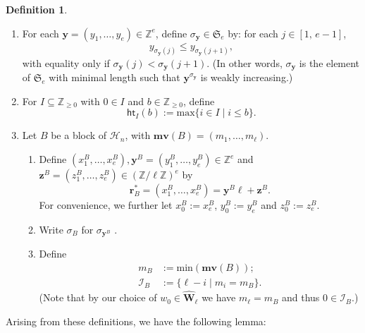 \documentclass[11pt,a4paper,reqno]{amsart}
\numberwithin{equation}{section}
\theoremstyle{plain}
\theoremstyle{definition}
\newtheorem{Def}[thm]{Definition}
\theoremstyle{remark}
\numberwithin{equation}{section}
\newcommand{\br}{\mathbf{r}}
\newcommand{\by}{\mathbf{y}}
\newcommand{\bz}{\mathbf{z}}
\newcommand{\mv}{\mathbf{mv}}
\renewcommand{\min}{\mathrm{min}}
\renewcommand{\max}{\mathrm{max}}
\newcommand{\ZZ}{\mathbb{Z}}
\newcommand{\HH}{\mathcal{H}}
\newcommand{\EW}{\widehat{\mathbf{W}}}
\newcommand{\sym}[1]{\mathfrak{S}_{#1}}
\newcommand{\Ht}{\mathsf{ht}}
\newcommand{\II}{\mathcal{I}}
\begin{document}
\begin{Def} \label{D:}  \hfill
\begin{enumerate}
\item For each $\by = (y_1,\dotsc, y_e) \in \ZZ^e$, define $\sigma_{\by} \in \sym{e}$ by: for each $j \in [1,\,e-1]$,
$$ y_{\sigma_{\by}(j)} \leq y_{\sigma_{\by}(j+1)},$$
 with equality only if $\sigma_{\by}(j) < \sigma_{\by}(j+1)$.
 (In other words, $\sigma_{\by}$ is the element of $\sym{e}$ with minimal length such that $\by^{\sigma_{\by}}$ is weakly increasing.)

\item For $I \subseteq \ZZ_{\geq 0}$ with $0 \in I$ and $b \in \ZZ_{\geq 0}$, define
        $$\Ht_I(b) := \max\{ i \in I \mid i \leq b \}.$$     

\item Let $B$ be a block of $\HH_n$, with $\mv(B) = (m_1,\dotsc, m_{\ell})$.
\begin{enumerate}
\item
Define $(x^B_1,\dotsc, x^B_e), \by^B = (y^B_1,\dotsc, y^B_e) \in \ZZ^e$ and $\bz^B = (z^B_1,\dotsc, z^B_e) \in (\ZZ/\ell\ZZ)^e$ by
    $$
    \br^*_B = (x^B_1,\dotsc, x^B_e) = \by^B \ell + \bz^B.
    $$
    For convenience, we further let $x^B_0 := x^B_e$, $y^B_0 := y^B_e$ and $z^B_0 := z^B_e$.\medskip

\item Write $\sigma_B$ for $\sigma_{\by^B}$%
    .

\item
Define
\begin{align*}
m_B &:= \min(\mv(B));  \\
\II_B &:= \{ \ell - i \mid m_i = m_B \}.
\end{align*}
(Note that by our choice of $w_0 \in \EW_{\ell}$ we have $m_{\ell} = m_B$ and thus $0 \in \II_B$.)

\end{enumerate}
\end{enumerate}
\end{Def}

Arising from these definitions, we have the following lemma:
\end{document}
